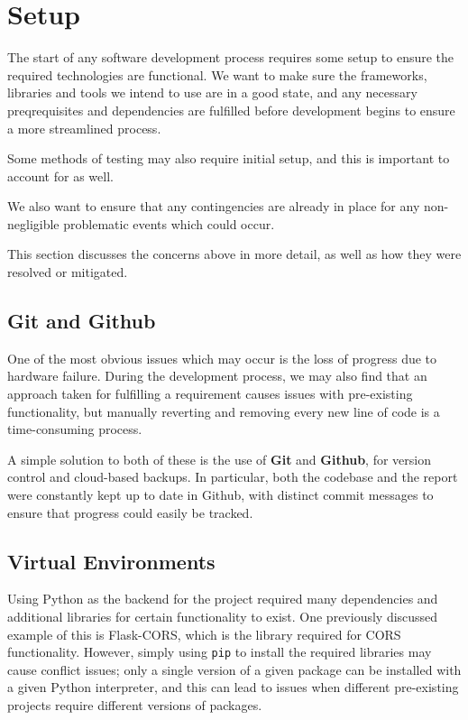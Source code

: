 \section{Setup}
The start of any software development process requires some setup to ensure the required technologies are functional. We want to make sure the frameworks, libraries and tools we intend to use are in a good state, and any necessary preqrequisites and dependencies are fulfilled before development begins to ensure a more streamlined process. 

Some methods of testing may also require initial setup, and this is important to account for as well.

We also want to ensure that any contingencies are already in place for any non-negligible problematic events which could occur. 

This section discusses the concerns above in more detail, as well as how they were resolved or mitigated.

\subsection{Git and Github}
One of the most obvious issues which may occur is the loss of progress due to hardware failure. During the development process, we may also find that an approach taken for fulfilling a requirement causes issues with pre-existing functionality, but manually reverting and removing every new line of code is a time-consuming process. 

A simple solution to both of these is the use of \textbf{Git} and \textbf{Github}, for version control and cloud-based backups. In particular, both the codebase and the report were constantly kept up to date in Github, with distinct commit messages to ensure that progress could easily be tracked. 

\subsection{Virtual Environments}
Using Python as the backend for the project required many dependencies and additional libraries for certain functionality to exist. One previously discussed example of this is Flask-CORS, which is the library required for CORS functionality. However, simply using \texttt{pip} to install the required libraries may cause conflict issues; only a single version of a given package can be installed with a given Python interpreter, and this can lead to issues when different pre-existing projects require different versions of packages.

